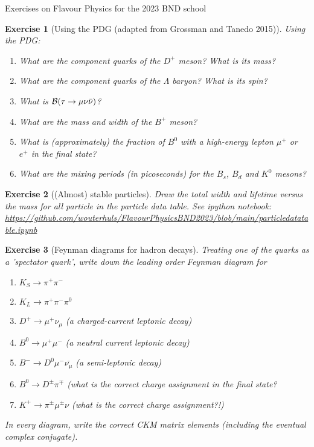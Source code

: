 \documentclass[12pt]{article}
\newcommand{\nbexercise}[1]{\url{https://github.com/wouterhuls/FlavourPhysicsBND2023/blob/main/#1}}
\newtheorem{homeworkexercise}{Exercise}
\newenvironment{enumexercise}{
  \renewcommand{\labelenumi}{\bfseries{(\alph{enumi})}}
  \leavevmode\begin{enumerate}}{\end{enumerate}\vspace{5pt}}
\newcommand{\Br}[1]{{\cal B}(#1)}
\begin{document}
\centerline{\Large Exercises on Flavour Physics for the 2023 BND school}


\begin{homeworkexercise}[Using the PDG (adapted from Grossman and Tanedo 2015)]  
  Using the PDG:
  \begin{enumexercise}
  \item What are the component quarks of the $D^+$ meson? What is its mass? 
  \item What are the component quarks of the $\Lambda$ baryon? What is its spin?
  \item What is $\Br{\tau \to \mu \nu \bar{\nu}}$?
  \item What are the mass and width of the $B^+$ meson?
  \item What is (approximately) the fraction of $B^0$ with a high-energy lepton $\mu^+$ or $e^+$ in the final state?
  \item What are the mixing periods (in picoseconds) for the $B_s$, $B_d$ and $K^0$ mesons?
  \end{enumexercise}
\end{homeworkexercise}

\begin{homeworkexercise}[(Almost) stable particles]
  Draw the total width and lifetime versus the mass for all particle in the particle data table. See ipython notebook:
  \nbexercise{particledatatable.ipynb}
\end{homeworkexercise} 

\begin{homeworkexercise}[Feynman diagrams for hadron decays]
  Treating one of the quarks as a 'spectator quark', write down the leading order Feynman diagram for
  \begin{enumexercise}
  \item $K_S \to \pi^+ \pi^-$
  \item $K_L \to \pi^+ \pi^- \pi^0$
  \item $D^+ \to \mu^+ \nu_\mu$ (a charged-current leptonic decay)
  \item $B^0 \to \mu^+ \mu^-$ (a neutral current leptonic decay)
  \item $B^- \to D^0 \mu^- \bar{\nu_\mu}$ (a semi-leptonic decay)
  \item $B^0 \to D^\pm \pi^\mp$ (what is the correct charge assignment in the final state?
  \item $K^+ \to \pi^\pm \mu^\pm \nu$ (what is the correct charge assignment?!) 
  \end{enumexercise}
  In every diagram, write the correct CKM matrix elements (including the eventual complex conjugate).
\end{homeworkexercise}
\end{document}
